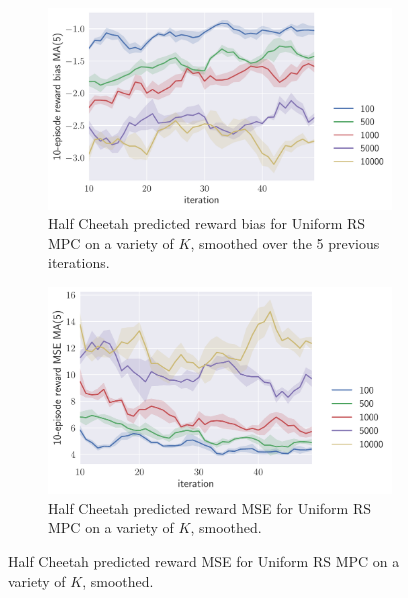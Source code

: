 \documentclass{article}
\begin{document}
\begin{figure}[!ht]
  \centering

  \begin{subfigure}[b]{0.48\columnwidth}
    \centering
    \includegraphics[width=\textwidth]{mpc-reward-bias.pdf}
    \caption{%
      Half Cheetah predicted reward bias for Uniform RS MPC on a variety of
      $K$, smoothed over the 5 previous iterations.
    }\label{fig:mpc-bias}
  \end{subfigure}\hspace{1em}
  \begin{subfigure}[b]{0.48\columnwidth}
    \centering
    \includegraphics[width=\textwidth]{mpc-reward-mse.pdf}
    \caption{%
      Half Cheetah predicted reward MSE for Uniform RS MPC on a variety of $K$,
      smoothed.
    }\label{fig:mpc-mse}
  \end{subfigure}

  \vspace{1em}


\end{figure}
\end{document}
